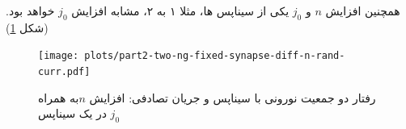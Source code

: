                 
                
                همچنین افزایش $n$ و $j_0$ 
                یکی از سیناپس ها، مثلا ۱ به ۲، مشابه افزایش 
                $j_0$ 
                خواهد بود.(شکل \ref{fig:part2-two-ng-fixed-synapse-diff-n-rand-curr})
                \begin{figure}[!ht]
                    \centering
                    \texttt{[image: plots/part2-two-ng-fixed-synapse-diff-n-rand-curr.pdf]} 
                    \caption{رفتار دو جمعیت نورونی با سیناپس و جریان تصادفی: افزایش $n$به همراه $j_0$ در یک سیناپس}
                    \label{fig:part2-two-ng-fixed-synapse-diff-n-rand-curr}
                \end{figure}
                
